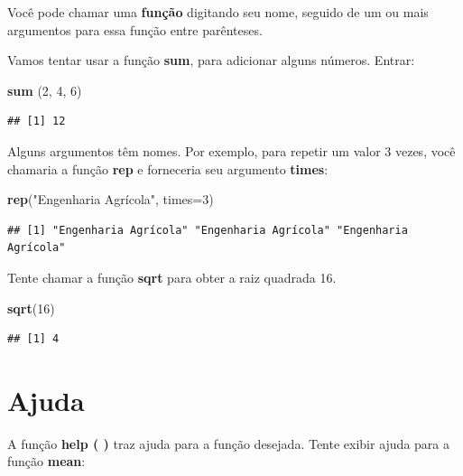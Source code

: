 \documentclass[]{book}
\newenvironment{Shaded}{\begin{snugshade}}{\end{snugshade}}
\newcommand{\DataTypeTok}[1]{\textcolor[rgb]{0.13,0.29,0.53}{#1}}
\newcommand{\DecValTok}[1]{\textcolor[rgb]{0.00,0.00,0.81}{#1}}
\newcommand{\KeywordTok}[1]{\textcolor[rgb]{0.13,0.29,0.53}{\textbf{#1}}}
\newcommand{\NormalTok}[1]{#1}
\newcommand{\StringTok}[1]{\textcolor[rgb]{0.31,0.60,0.02}{#1}}
\begin{document}
Você pode chamar uma \textbf{função} digitando seu nome, seguido de um ou mais argumentos para essa função entre parênteses.

Vamos tentar usar a função \textbf{sum}, para adicionar alguns números. Entrar:

\begin{Shaded}
\begin{Highlighting}[]
\KeywordTok{sum}\NormalTok{ (}\DecValTok{2}\NormalTok{, }\DecValTok{4}\NormalTok{, }\DecValTok{6}\NormalTok{)}
\end{Highlighting}
\end{Shaded}

\begin{verbatim}
## [1] 12
\end{verbatim}

Alguns argumentos têm nomes. Por exemplo, para repetir um valor 3 vezes, você chamaria a função \textbf{rep} e forneceria seu argumento \textbf{times}:

\begin{Shaded}
\begin{Highlighting}[]
\KeywordTok{rep}\NormalTok{(}\StringTok{"Engenharia Agrícola"}\NormalTok{, }\DataTypeTok{times=}\DecValTok{3}\NormalTok{)}
\end{Highlighting}
\end{Shaded}

\begin{verbatim}
## [1] "Engenharia Agrícola" "Engenharia Agrícola" "Engenharia Agrícola"
\end{verbatim}

Tente chamar a função \textbf{sqrt} para obter a raiz quadrada 16.

\begin{Shaded}
\begin{Highlighting}[]
\KeywordTok{sqrt}\NormalTok{(}\DecValTok{16}\NormalTok{)}
\end{Highlighting}
\end{Shaded}

\begin{verbatim}
## [1] 4
\end{verbatim}

\hypertarget{ajuda}{%
\section{Ajuda}\label{ajuda}}

A função \textbf{help ( )} traz ajuda para a função desejada. Tente exibir ajuda para a função \textbf{mean}:
\end{document}
